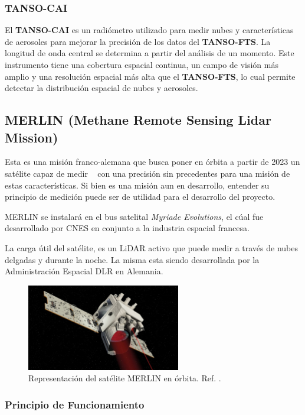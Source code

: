 \documentclass[11pt,titlepage]{article}
\begin{document}
\subsubsection{TANSO-CAI}

El \textbf{TANSO-CAI} es un radiómetro utilizado para medir nubes y características de aerosoles para mejorar la precisión de los datos del \textbf{TANSO-FTS}. La longitud de onda central se determina a partir del análisis de un momento. Este instrumento tiene una cobertura espacial continua, un campo de visión más amplio y una resolución espacial más alta que el \textbf{TANSO-FTS}, lo cual permite detectar la distribución espacial de nubes y aerosoles.\cite{CAI-GOSAT}

\subsection{MERLIN (Methane Remote Sensing Lidar Mission)}

Esta es una misión franco-alemana que busca poner en órbita a partir de 2023 un satélite capaz de medir \metano~ con una precisión sin precedentes para una misión de estas características. Si bien es una misión aun en desarrollo, entender su principio de medición puede ser de utilidad para el desarrollo del proyecto.\par
MERLIN se instalará en el bus satelital \textit{Myriade Evolutions}, el cúal fue desarrollado por CNES en conjunto a la industria espacial francesa.\par
La carga útil del satélite, es un LiDAR activo que puede medir a través de nubes delgadas y durante la noche. La misma esta siendo desarrollada por la Administración Espacial DLR en Alemania.

    \begin{figure}[htb!]
    \centering
    \includegraphics[width=0.6\textwidth]{fig/MERLIN.jpg}
    \caption{Representación del satélite MERLIN en órbita. Ref. \cite{MERLIN}.}
    \label{fig:MERLIN}
\end{figure}

\subsubsection{Principio de Funcionamiento}
\end{document}

